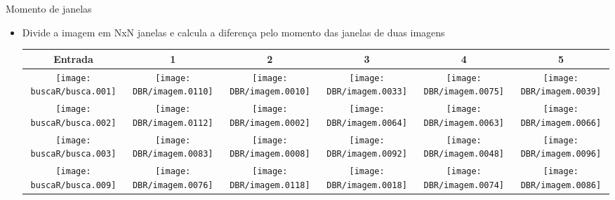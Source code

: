 \documentclass[
    style=paintings,
    paper=screen,
    blackslide,
    nopagebreaks,
    fleqn
]{powerdot}
\begin{document}
\begin{slide}{Momento de janelas}
\begin{itemize}[type=1]
\item <1-> Divide a imagem em NxN janelas e calcula a diferença pelo momento
das janelas de duas imagens
\vspace{-0.8cm}
\begin{table}[H]
\begin{center}
\begin{tabular}{c|ccccc}
\hline 
Entrada & 1 & 2 & 3 & 4 & 5\tabularnewline
\hline
\texttt{[image: buscaR/busca.001]} & 
\texttt{[image: DBR/imagem.0110]} & 
\texttt{[image: DBR/imagem.0010]} & 
\texttt{[image: DBR/imagem.0033]} & 
\texttt{[image: DBR/imagem.0075]} &
\texttt{[image: DBR/imagem.0039]} 
\tabularnewline
\hline 
\texttt{[image: buscaR/busca.002]} & 
\texttt{[image: DBR/imagem.0112]} & 
\texttt{[image: DBR/imagem.0002]} & 
\texttt{[image: DBR/imagem.0064]} & 
\texttt{[image: DBR/imagem.0063]} &
\texttt{[image: DBR/imagem.0066]} 
\tabularnewline
\hline 
\texttt{[image: buscaR/busca.003]} & 
\texttt{[image: DBR/imagem.0083]} & 
\texttt{[image: DBR/imagem.0008]} & 
\texttt{[image: DBR/imagem.0092]} & 
\texttt{[image: DBR/imagem.0048]} &
\texttt{[image: DBR/imagem.0096]} 
\tabularnewline
\hline 
\texttt{[image: buscaR/busca.009]} & 
\texttt{[image: DBR/imagem.0076]} & 
\texttt{[image: DBR/imagem.0118]} & 
\texttt{[image: DBR/imagem.0018]} & 
\texttt{[image: DBR/imagem.0074]} &
\texttt{[image: DBR/imagem.0086]} 
\tabularnewline
\hline 
\end{tabular}
\end{center}
\end{table}
\end{itemize}
\end{slide}
\end{document}
